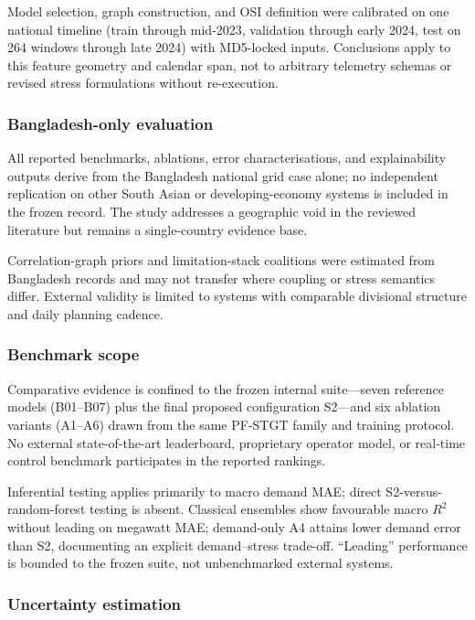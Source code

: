 Model selection, graph construction, and OSI definition were calibrated on one national timeline (train through mid-2023, validation through early 2024, test on 264 windows through late 2024) with MD5-locked inputs. Conclusions apply to this feature geometry and calendar span, not to arbitrary telemetry schemas or revised stress formulations without re-execution.

\subsubsection{Bangladesh-only evaluation}\label{subsubsection:bangladesh_only_evaluation}

All reported benchmarks, ablations, error characterisations, and explainability outputs derive from the Bangladesh national grid case alone; no independent replication on other South Asian or developing-economy systems is included in the frozen record. The study addresses a geographic void in the reviewed literature but remains a single-country evidence base.

Correlation-graph priors and limitation-stack coalitions were estimated from Bangladesh records and may not transfer where coupling or stress semantics differ. External validity is limited to systems with comparable divisional structure and daily planning cadence.

\subsubsection{Benchmark scope}\label{subsubsection:benchmark_scope}

Comparative evidence is confined to the frozen internal suite---seven reference models (B01--B07) plus the final proposed configuration S2---and six ablation variants (A1--A6) drawn from the same PF-STGT family and training protocol. No external state-of-the-art leaderboard, proprietary operator model, or real-time control benchmark participates in the reported rankings.

Inferential testing applies primarily to macro demand MAE; direct S2-versus-random-forest testing is absent. Classical ensembles show favourable macro $R^2$ without leading on megawatt MAE; demand-only A4 attains lower demand error than S2, documenting an explicit demand--stress trade-off. ``Leading'' performance is bounded to the frozen suite, not unbenchmarked external systems.

\subsubsection{Uncertainty estimation}\label{subsubsection:uncertainty_estimation}

